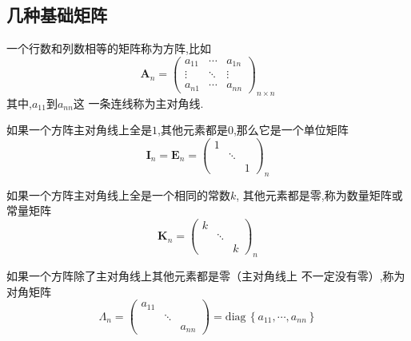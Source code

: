 \subsection{几种基础矩阵}
\begin{formal}
\begin{definition}[方阵]\label{def:方阵}
一个行数和列数相等的矩阵称为方阵,比如
\[ 
    \bm{A}_{n} = \begin{pmatrix}
        a_{11}  & \cdots & a_{1n} \\
        \vdots & \ddots  & \vdots \\
        a_{n1}  & \cdots & a_{nn}
    \end{pmatrix}_{n \times n}
\]
其中,$a_{11}$到$a_{nn}$这
一条连线称为主对角线.
\end{definition}
\end{formal}
\begin{formal}
\begin{definition}[单位阵]\label{def:单位阵}
如果一个方阵主对角线上全是$1$,其他元素都是$
 0$,那么它是一个单位矩阵
\[
    \bm{I}_{n}  = \bm{E}_n = \begin{pmatrix}
        1 & & \\
        & \ddots &\\
        &&1
    \end{pmatrix}
    _{n}
\]
\end{definition}
\end{formal}
\begin{formal}
\begin{definition}[常量矩阵]\label{def:常量矩阵}
如果一个方阵主对角线上全是一个相同的常数$k$,
其他元素都是零,称为数量矩阵或常量矩阵
\[
    \bm{K}_n = \begin{pmatrix}
        k & & \\
        & \ddots &\\
        &&k
    \end{pmatrix}
    _n
\]
\end{definition}
\end{formal}
\vfill
\begin{formal}
\begin{definition}[对角矩阵]\label{def:对角矩阵}
如果一个方阵除了主对角线上其他元素都是零（主对角线上
不一定没有零）,称为对角矩阵
\[
    \bm{\varLambda} _n = \begin{pmatrix}
        a_{11} & & \\
        & \ddots &\\
        &&a_{nn}
    \end{pmatrix}= \mathrm{diag}\,\left\{
        a_{11},\cdots,a_{nn}
    \right\}
\]
\end{definition}
\end{formal}
